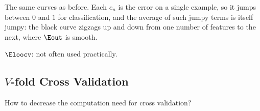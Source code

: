The same curves as before. Each \(e_n\) is the error on a single example, so
it jumps between \(0\) and \(1\) for classification, and the average of such
jumpy terms is itself jumpy: the black curve zigzags up and down from one
number of features to the next, where \(\Eout\) is smooth.

\begin{moral}
    \(\Eloocv\): not often used practically.
\end{moral}

\subsection{\texorpdfstring{\(V\)}{V}-fold Cross Validation}

\begin{question}
    How to decrease the computation need for cross validation?
\end{question}

